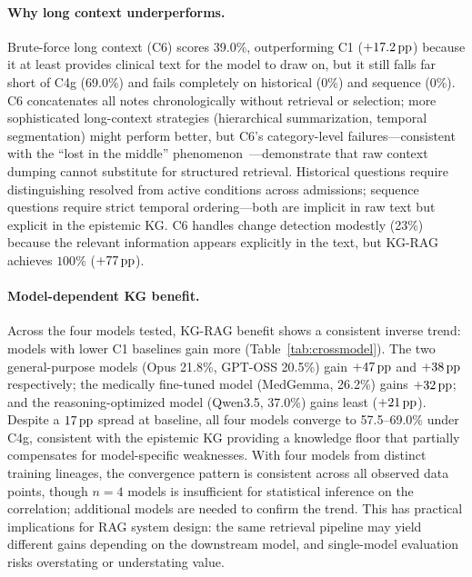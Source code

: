 
\paragraph{Why long context underperforms.}
Brute-force long context (C6) scores 39.0\%, outperforming C1 ($+17.2\,\text{pp}$) because it at least provides clinical text for the model to draw on, but it still falls far short of C4g (69.0\%) and fails completely on historical (0\%) and sequence (0\%).
C6 concatenates all notes chronologically without retrieval or selection; more sophisticated long-context strategies (hierarchical summarization, temporal segmentation) might perform better, but C6's category-level failures---consistent with the ``lost in the middle'' phenomenon~\cite{liu2024lostmiddle}---demonstrate that raw context dumping cannot substitute for structured retrieval.
Historical questions require distinguishing resolved from active conditions across admissions; sequence questions require strict temporal ordering---both are implicit in raw text but explicit in the epistemic KG.
C6 handles change detection modestly (23\%) because the relevant information appears explicitly in the text, but KG-RAG achieves $100\%$ ($+77\,\text{pp}$).

\paragraph{Model-dependent KG benefit.}
Across the four models tested, KG-RAG benefit shows a consistent inverse trend: models with lower C1 baselines gain more (Table~\ref{tab:crossmodel}).
The two general-purpose models (Opus 21.8\%, GPT-OSS 20.5\%) gain $+47\,\text{pp}$ and $+38\,\text{pp}$ respectively; the medically fine-tuned model (MedGemma, 26.2\%) gains $+32\,\text{pp}$; and the reasoning-optimized model (Qwen3.5, 37.0\%) gains least ($+21\,\text{pp}$).
Despite a $17\,\text{pp}$ spread at baseline, all four models converge to 57.5--69.0\% under C4g, consistent with the epistemic KG providing a knowledge floor that partially compensates for model-specific weaknesses.
With four models from distinct training lineages, the convergence pattern is consistent across all observed data points, though $n = 4$ models is insufficient for statistical inference on the correlation; additional models are needed to confirm the trend.
This has practical implications for RAG system design: the same retrieval pipeline may yield different gains depending on the downstream model, and single-model evaluation risks overstating or understating value.

